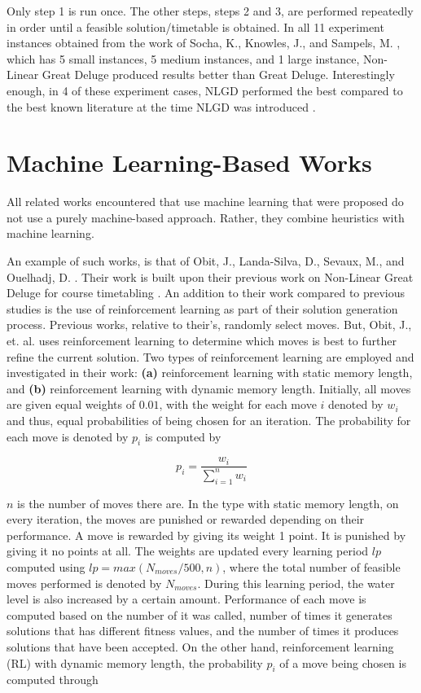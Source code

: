 Only step 1 is run once. The other steps, steps 2 and 3, are performed repeatedly in order until a feasible solution/timetable is obtained. In all 11 experiment instances obtained from the work of Socha, K., Knowles, J., and Sampels, M. \cite{socha-maxmin-ant-system}, which has 5 small instances, 5 medium instances, and 1 large instance, Non-Linear Great Deluge produced results better than Great Deluge. Interestingly enough, in 4 of these experiment cases, NLGD performed the best compared to the best known literature at the time NLGD was introduced \cite{nlgd-landa-silva}.

\section{Machine Learning-Based Works}
All related works encountered that use machine learning that were proposed do not use a purely machine-based approach. Rather, they combine heuristics with machine learning.

An example of such works, is that of Obit, J., Landa-Silva, D., Sevaux, M., and Ouelhadj, D. \cite{nlgdrl-obit}. Their work is built upon their previous work on Non-Linear Great Deluge for course timetabling \cite{nlgd-landa-silva}. An addition to their work compared to previous studies is the use of reinforcement learning as part of their solution generation process. Previous works, relative to their's, randomly select moves. But, Obit, J., et. al. uses reinforcement learning to determine which moves is best to further refine the current solution. Two types of reinforcement learning are employed and investigated in their work: \textbf{(a)} reinforcement learning with static memory length, and \textbf{(b)} reinforcement learning with dynamic memory length. Initially, all moves are given equal weights of $0.01$, with the weight for each move $i$ denoted by $w_{i}$ and thus, equal probabilities of being chosen for an iteration. The probability for each move is denoted by $p_{i}$ is computed by

\[
	p_{i} = \frac{w_{i}}{\sum_{i=1}^{n}w_{i}}
\]

$n$ is the number of moves there are. In the type with static memory length, on every iteration, the moves are punished or rewarded depending on their performance. A move is rewarded by giving its weight 1 point. It is punished by giving it no points at all. The weights are updated every learning period $lp$ computed using $lp = max(N_{moves}/500, n)$, where the total number of feasible moves performed is denoted by $N_{moves}$. During this learning period, the water level is also increased by a certain amount. Performance of each move is computed based on the number of it was called, number of times it generates solutions that has different fitness values, and the number of times it produces solutions that have been accepted. On the other hand, reinforcement learning (RL) with dynamic memory length, the probability $p_{i}$ of a move being chosen is computed through

